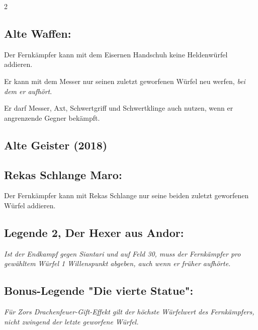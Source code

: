 \documentclass[10pt, a4paper, oneside]{book}
\newcommand{\fan}[1]{\textit{#1}}
\begin{document}
\begin{multicols*}{2}
\begin{bgcolor}
\subsection{Alte Waffen:}

Der Fernkämpfer kann mit dem Eisernen Handschuh keine Heldenwürfel addieren.
\supercite{dlh-begleitheft}

Er kann mit dem Messer nur seinen zuletzt geworfenen Würfel neu werfen,\supercite{dlh-begleitheft} \fan{bei dem er aufhört}.

Er darf Messer, Axt, Schwertgriff und Schwertklinge auch nutzen, wenn er angrenzende Gegner bekämpft.
\supercite{dlh-begleitheft}


\end{bgcolor}



\begin{bgcolor}[color-ag]
\section{Alte Geister (2018)}

\subsection{Rekas Schlange Maro:}

Der Fernkämpfer kann mit Rekas Schlange nur seine beiden zuletzt geworfenen Würfel addieren.
\supercite{ag-begleitheft}


\subsection{Legende 2, Der Hexer aus Andor:}

\fan{Ist der Endkampf gegen Siantari und auf Feld 30, muss der Fernkämpfer pro gewähltem Würfel 1 Willenspunkt abgeben, auch wenn er früher aufhörte.}


\subsection{Bonus-Legende "Die vierte Statue":}

\fan{Für Zors Drachenfeuer-Gift-Effekt gilt der höchste Würfelwert des Fernkämpfers, nicht zwingend der letzte geworfene Würfel.}


\end{bgcolor}



\columnbreak






\end{multicols*}
\end{document}
